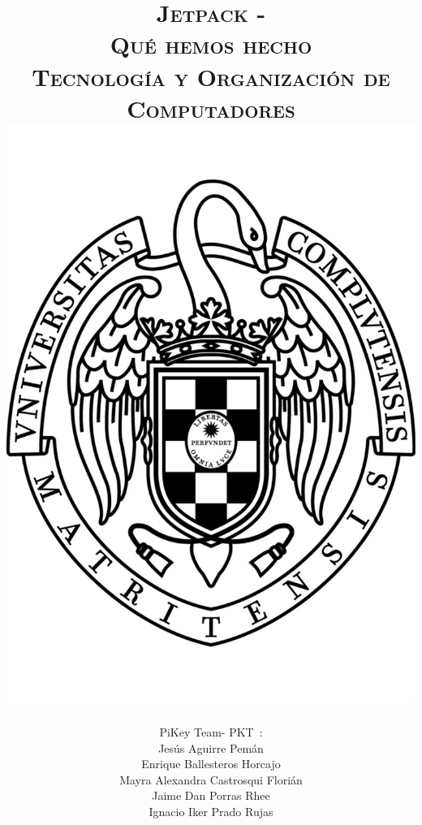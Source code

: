 \documentclass[11pt, a4paper, spanish, openright, twoside]{book}
\newcommand*{\PKT}{\hbox{P}\kern-2.5pt\lower3.5pt\hbox{\small{K}}\kern-2.8pt\hbox{T}\kern-2pt}	%
\begin{document}
 
\title{\Huge{\textsc{Jetpack -\\
	Qué hemos hecho}} \\
	\vspace{0.7cm}
	 \textsc{\Large{Tecnología y Organización de Computadores}} \\
	\includegraphics[scale=0.3]{ucm.pdf}}
\author{{\Large{PiKey Team-}} \PKT \ : \vspace{0.2cm} \\
	Jesús Aguirre Pemán \\
	 Enrique Ballesteros Horcajo \\
	 Mayra Alexandra Castrosqui Florián\\
	 Jaime Dan Porras Rhee \\
	 Ignacio Iker Prado Rujas}
\date{\Today}
\maketitle
\end{document}
